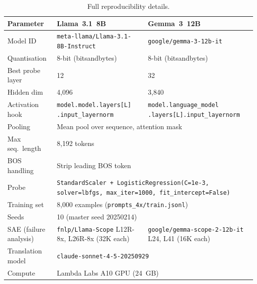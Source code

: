 \documentclass{article}
\newcommand{\llama}{Llama~3.1~8B\xspace}
\newcommand{\gemma}{Gemma~3~12B\xspace}
\begin{document}
\begin{table}[t]
\centering
\scriptsize
\caption{Full reproducibility details.}
\label{tab:repro}
\setlength{\tabcolsep}{4pt}
\begin{tabular}{p{3.2cm}p{4.8cm}p{4.8cm}}
\toprule
Parameter              & \llama & \gemma \\
\midrule
Model ID               & {\scriptsize\texttt{meta-llama/Llama-3.1-8B-Instruct}}
                       & {\scriptsize\texttt{google/gemma-3-12b-it}} \\[2pt]
Quantisation           & 8-bit (bitsandbytes) & 8-bit (bitsandbytes) \\
Best probe layer       & 12     & 32 \\
Hidden dim             & 4,096  & 3,840 \\
Activation hook        & {\scriptsize\texttt{model.model.layers[L] .input\_layernorm}}
                       & {\scriptsize\texttt{model.language\_model .layers[L].input\_layernorm}} \\[2pt]
Pooling                & \multicolumn{2}{l}{Mean pool over sequence, attention mask} \\
Max seq.\ length       & \multicolumn{2}{l}{8,192 tokens} \\
BOS handling           & \multicolumn{2}{l}{Strip leading BOS token} \\
Probe                  & \multicolumn{2}{p{9.6cm}}{%
                         {\scriptsize\texttt{StandardScaler + LogisticRegression(C=1e-3,
                         solver=lbfgs, max\_iter=1000, fit\_intercept=False)}}} \\[2pt]
Training set           & \multicolumn{2}{l}{8,000 examples (\texttt{prompts\_4x/train.jsonl})} \\
Seeds                  & \multicolumn{2}{l}{10 (master seed 20250214)} \\
SAE (failure analysis) & {\scriptsize\texttt{fnlp/Llama-Scope} L12R-8x, L26R-8x (32K each)}
                       & {\scriptsize\texttt{google/gemma-scope-2-12b-it} L24, L41 (16K each)} \\[2pt]
Translation model      & \multicolumn{2}{l}{\texttt{claude-sonnet-4-5-20250929}} \\
Compute                & \multicolumn{2}{l}{Lambda Labs A10 GPU (24~GB)} \\
\bottomrule
\end{tabular}
\end{table}
\end{document}
